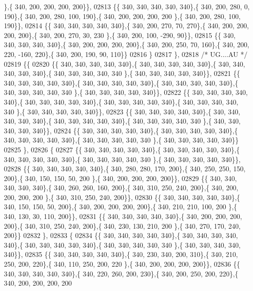 \begin{DoxyCode}
      \},\{ 340, 200, 200, 200, 200\}\},
02813 \{\{ 340, 340, 340, 340, 340\},\{ 340, 200, 280,   0, 190\},\{ 340, 200, 280, 100, 190\},\{ 340, 200, 200, 200, 200
      \},\{ 340, 200, 280, 100, 190\}\},
02814 \{\{ 340, 340, 340, 340, 340\},\{ 340, 200, 270,  70, 270\},\{ 340, 200, 200, 200, 200\},\{ 340, 200, 270,  30, 230
      \},\{ 340, 200, 100, -290,  90\}\},
02815 \{\{ 340, 340, 340, 340, 340\},\{ 340, 200, 200, 200, 200\},\{ 340, 200, 250,  70, 160\},\{ 340, 200, 220, -160, 
      220\},\{ 340, 200, 190,  90, 110\}\}
02816 \}
02817 \},
02818 \textcolor{comment}{/* UG....AU */}
02819 \{\{
02820 \{\{ 340, 340, 340, 340, 340\},\{ 340, 340, 340, 340, 340\},\{ 340, 340, 340, 340, 340\},\{ 340, 340, 340, 340, 340
      \},\{ 340, 340, 340, 340, 340\}\},
02821 \{\{ 340, 340, 340, 340, 340\},\{ 340, 340, 340, 340, 340\},\{ 340, 340, 340, 340, 340\},\{ 340, 340, 340, 340, 340
      \},\{ 340, 340, 340, 340, 340\}\},
02822 \{\{ 340, 340, 340, 340, 340\},\{ 340, 340, 340, 340, 340\},\{ 340, 340, 340, 340, 340\},\{ 340, 340, 340, 340, 340
      \},\{ 340, 340, 340, 340, 340\}\},
02823 \{\{ 340, 340, 340, 340, 340\},\{ 340, 340, 340, 340, 340\},\{ 340, 340, 340, 340, 340\},\{ 340, 340, 340, 340, 340
      \},\{ 340, 340, 340, 340, 340\}\},
02824 \{\{ 340, 340, 340, 340, 340\},\{ 340, 340, 340, 340, 340\},\{ 340, 340, 340, 340, 340\},\{ 340, 340, 340, 340, 340
      \},\{ 340, 340, 340, 340, 340\}\}
02825 \},
02826 \{
02827 \{\{ 340, 340, 340, 340, 340\},\{ 340, 340, 340, 340, 340\},\{ 340, 340, 340, 340, 340\},\{ 340, 340, 340, 340, 340
      \},\{ 340, 340, 340, 340, 340\}\},
02828 \{\{ 340, 340, 340, 340, 340\},\{ 340, 280, 280, 170, 200\},\{ 340, 250, 250, 150, 200\},\{ 340, 150, 150,  50, 200
      \},\{ 340, 200, 200, 200, 200\}\},
02829 \{\{ 340, 340, 340, 340, 340\},\{ 340, 260, 260, 160, 200\},\{ 340, 310, 250, 240, 200\},\{ 340, 200, 200, 200, 200
      \},\{ 340, 310, 250, 240, 200\}\},
02830 \{\{ 340, 340, 340, 340, 340\},\{ 340, 150, 150,  50, 200\},\{ 340, 200, 200, 200, 200\},\{ 340, 210, 210, 100, 200
      \},\{ 340, 130,  30, 110, 200\}\},
02831 \{\{ 340, 340, 340, 340, 340\},\{ 340, 200, 200, 200, 200\},\{ 340, 310, 250, 240, 200\},\{ 340, 230, 130, 210, 200
      \},\{ 340, 270, 170, 240, 200\}\}
02832 \},
02833 \{
02834 \{\{ 340, 340, 340, 340, 340\},\{ 340, 340, 340, 340, 340\},\{ 340, 340, 340, 340, 340\},\{ 340, 340, 340, 340, 340
      \},\{ 340, 340, 340, 340, 340\}\},
02835 \{\{ 340, 340, 340, 340, 340\},\{ 340, 230, 340, 200, 310\},\{ 340, 210, 250, 200, 220\},\{ 340, 110, 250, 200, 220
      \},\{ 340, 200, 200, 200, 200\}\},
02836 \{\{ 340, 340, 340, 340, 340\},\{ 340, 220, 260, 200, 230\},\{ 340, 200, 250, 200, 220\},\{ 340, 200, 200, 200, 200

\end{DoxyCode}
